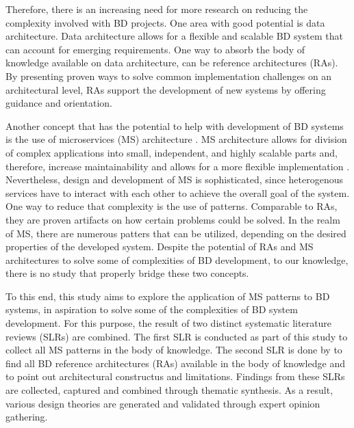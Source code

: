 \documentclass{bmcart}
\begin{document}
Therefore, there is an increasing need for more research on reducing the complexity involved with BD projects. One area with good potential is data architecture. Data architecture allows for a flexible and scalable BD system that can account for emerging requirements. One way to absorb the body of knowledge available on data architecture, can be reference architectures (RAs). By presenting proven ways to solve common implementation challenges on an architectural level, RAs support the development of new systems by offering guidance and orientation.





% 


Another concept that has the potential to help with development of BD systems is the use of microservices (MS) architecture \cite{freymann2020tackling}. MS architecture allows for division of complex applications into small, independent, and highly scalable parts and, therefore, increase maintainability and allows for a more flexible implementation \cite{Richardson.2022}. Nevertheless, design and development of MS is sophisticated, since heterogenous services have to interact with each other to achieve the overall goal of the system. One way to reduce that complexity is the use of patterns. Comparable to RAs, they are proven artifacts on how certain problems could be solved. In the realm of MS, there are numerous patters that can be utilized, depending on the desired properties of the developed system. Despite the potential of RAs and MS architectures to solve some of complexities of BD development, to our knowledge, there is no study that properly bridge these two concepts. 


To this end, this study aims to explore the application of MS patterns to BD systems, in aspiration to solve some of the complexities of BD system development. For this purpose, the result of two distinct systematic literature reviews (SLRs) are combined. The first SLR is conducted as part of this study to collect all MS patterns in the body of knowledge. The second SLR is done by \cite{ataei2022state} to find all BD reference architectures (RAs) available in the body of knowledge and to point out architectural constructus and limitations. Findings from these SLRs are collected, captured and combined through thematic synthesis. As a result, various design theories are generated and validated through expert opinion gathering.  
\end{document}
